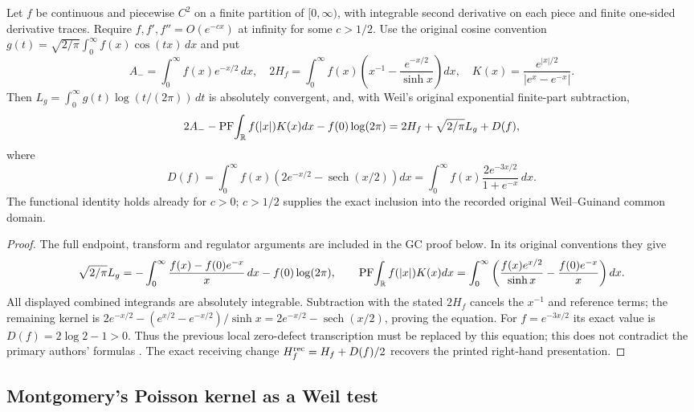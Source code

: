 \begin{theorem}
\label{thm:guinand-weil-residual-complete}
Let $f$ be continuous and piecewise $C^2$ on a finite partition of
$[0,\infty)$, with integrable second derivative on each piece and finite
one-sided derivative traces. Require $f,f',f''=O(e^{-cx})$ at infinity
for some $c>1/2$. Use the original cosine convention
$g(t)=\sqrt{2/\pi}\int_0^\infty f(x)\cos(tx)\,dx$ and put
\[
 A_-=\int_0^\infty f(x)e^{-x/2}\,dx,\quad
 2H_f=\int_0^\infty f(x)\left(x^{-1}-\frac{e^{-x/2}}{\sinh x}\right)dx,
 \quad K(x)=\frac{e^{|x|/2}}{|e^x-e^{-x}|}.
\]
Then $L_g=\int_0^\infty g(t)\log(t/(2\pi))\,dt$ is absolutely convergent,
and, with Weil's original exponential finite-part subtraction,
\begin{equation}
 2A_--\operatorname{PF}\!\int_\mathbb R f(|x|)K(x)dx-f(0)\log(2\pi)
 =2H_f+\sqrt{2/\pi}L_g+D(f),
 \label{eq:guinand-weil-residual-complete}
\end{equation}
where
\[
 D(f)=\int_0^\infty f(x)\left(2e^{-x/2}-\operatorname{sech}(x/2)\right)dx
 =\int_0^\infty f(x)\frac{2e^{-3x/2}}{1+e^{-x}}\,dx.
\]
The functional identity holds already for $c>0$; $c>1/2$ supplies the
exact inclusion into the recorded original Weil--Guinand common domain.
\end{theorem}
\begin{proof}
The full endpoint, transform and regulator arguments are included in the
GC proof below. In its original conventions they give
\[
 \sqrt{2/\pi}L_g=-\int_0^\infty\frac{f(x)-f(0)e^{-x}}x\,dx-f(0)\log(2\pi),
 \qquad
 \operatorname{PF}\!\int_\mathbb R f(|x|)K(x)dx
 =\int_0^\infty\left(\frac{f(x)e^{x/2}}{\sinh x}-\frac{f(0)e^{-x}}x\right)dx.
\]
All displayed combined integrands are absolutely integrable. Subtraction
with the stated $2H_f$ cancels the $x^{-1}$ and reference terms; the
remaining kernel is
$2e^{-x/2}-(e^{x/2}-e^{-x/2})/\sinh x
=2e^{-x/2}-\operatorname{sech}(x/2)$, proving the equation.
For $f=e^{-3x/2}$ its exact value is $D(f)=2\log2-1>0$.
Thus the previous local zero-defect transcription must be replaced by
this equation; this does not contradict the primary authors' formulas
\cite{guinand1948,weil1952}. The exact receiving change
$H_f^{\rm rec}=H_f+D(f)/2$ recovers the printed right-hand presentation.
\end{proof}

\subsection{Montgomery's Poisson kernel as a Weil test}

